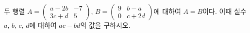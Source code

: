 두 행렬 $A=\begin{pmatrix} a-2b & -7 \\ 3c+d & 5 \end{pmatrix}$, $B=\begin{pmatrix} 9 & b-a \\ 0 & c+2d \end{pmatrix}$에 대하여 $A=B$이다. 이때 실수 $a$, $b$, $c$, $d$에 대하여 $ac-bd$의 값을 구하시오.
